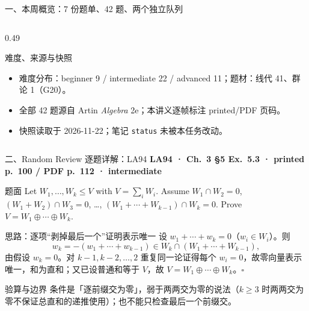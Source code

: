 \documentclass[aspectratio=169,10pt,fontset=none]{ctexbeamer}
\newcommand{\ex}[1]{\textcolor{accent}{\footnotesize\bfseries #1}}
\begin{document}
\begin{frame}[t]{一、本周概览：7 份题单、42 题、两个独立队列}
\begin{columns}[T,onlytextwidth]
\begin{column}{0.49\textwidth}
      \begin{block}{\footnotesize 难度、来源与快照}
        \scriptsize
        \begin{itemize}\setlength{\itemsep}{1pt}
          \item 难度分布：beginner 9 / intermediate 22 / advanced 11；题材：线代 41、群论 1（G20）。
          \item 全部 42 题源自 Artin \textit{Algebra} 2e；本讲义逐帧标注 printed/PDF 页码。
          \item 快照读取于 2026-11-22；笔记 \texttt{status} 未被本任务改动。
        \end{itemize}
      \end{block}
    \end{column}
  \end{columns}
\end{frame}

\begin{frame}[t]{二、Random Review 逐题详解：LA94}
  \leavevmode\ex{LA94 · Ch.~3 §5 Ex.~5.3 · printed p.~100 / PDF p.~112 · intermediate}
  \begin{block}{\footnotesize 题面}
    \scriptsize Let $W_1,\ldots,W_k\le V$ with $V=\sum_iW_i$. Assume $W_1\cap W_2=0$, $(W_1+W_2)\cap W_3=0$, \ldots, $(W_1+\cdots+W_{k-1})\cap W_k=0$. Prove $V=W_1\oplus\cdots\oplus W_k$.
  \end{block}
  \begin{exampleblock}{\footnotesize 思路：逐项“剥掉最后一个”证明表示唯一}
    \scriptsize
    设 $w_1+\cdots+w_k=0$（$w_i\in W_i$）。则
    $$w_k=-(w_1+\cdots+w_{k-1})\in W_k\cap(W_1+\cdots+W_{k-1}),$$
    由假设 $w_k=0$。对 $k-1,k-2,\ldots,2$ 重复同一论证得每个 $w_i=0$，故零向量表示唯一，和为直和；又已设普通和等于 $V$，故 $V=W_1\oplus\cdots\oplus W_k$。$\square$
  \end{exampleblock}
  \begin{block}{\footnotesize 验算与边界}
    \scriptsize 条件是「逐前缀交为零」，弱于两两交为零的说法（$k\ge3$ 时两两交为零不保证总直和的递推使用）；也不能只检查最后一个前缀交。
  \end{block}
\end{frame}
\end{document}
